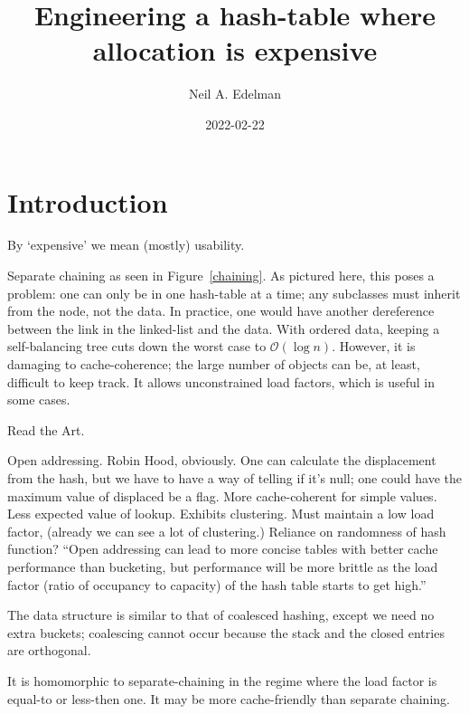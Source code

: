 \documentclass[12pt]{article}
\author{Neil A. Edelman}
\title{Engineering a hash-table where allocation is expensive}
\date{2022-02-22}
\begin{document}
\maketitle


\section{Introduction}

By `expensive' we mean (mostly) usability.

Separate chaining as seen in Figure~\ref{chaining}. As pictured here, this poses a problem: one can only be in one hash-table at a time; any subclasses must inherit from the node, not the data. In practice, one would have another dereference between the link in the linked-list and the data. With ordered data, keeping a self-balancing tree cuts down the worst case to $\mathcal{O}(\log n)$\cite{knuth1998sorting}. However, it is damaging to cache-coherence; the large number of objects can be, at least, difficult to keep track. It allows unconstrained load factors, which is useful in some cases.

Read the Art.

Open addressing. Robin Hood, obviously.\cite{wiki?} One can calculate the displacement from the hash, but we have to have a way of telling if it's null; one could have the maximum value of displaced be a flag. More cache-coherent for simple values. Less expected value of lookup. Exhibits clustering. Must maintain a low load factor, (already we can see a lot of clustering.) Reliance on randomness of hash function? ``Open addressing can lead to more concise tables with better cache performance than bucketing, but performance will be more brittle as the load factor (ratio of occupancy to capacity) of the hash table starts to get high.''\cite{skiena2008algorithm}

The data structure is similar to that of coalesced hashing\cite{williams1959handling}, except we need no extra buckets; coalescing cannot occur because the stack and the closed entries are orthogonal.

It is homomorphic to separate-chaining in the regime where the load factor is equal-to or less-then one. It may be more cache-friendly than separate chaining.
\end{document}

